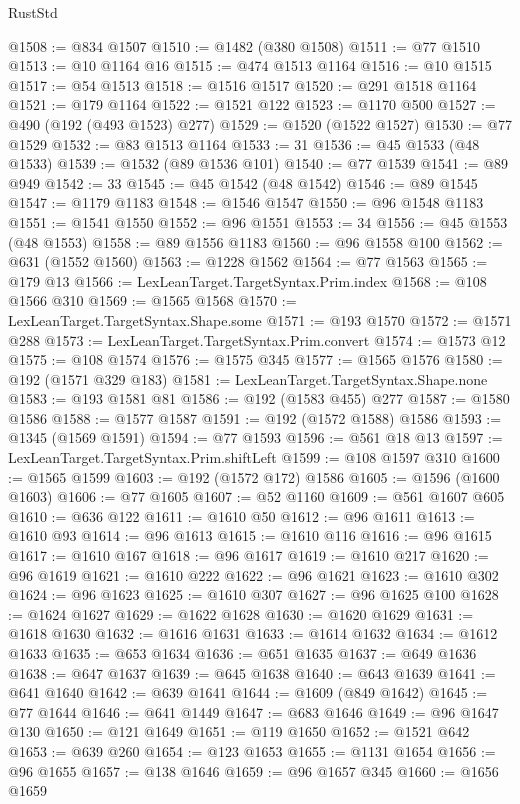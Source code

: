 \begin{lexlean}{RustStd}
\begin{coremodule}
@1508 := @834 @1507
@1510 := @1482 (@380 @1508)
@1511 := @77 @1510
@1513 := @10 @1164 @16
@1515 := @474 @1513 @1164
@1516 := @10 @1515
@1517 := @54 @1513
@1518 := @1516 @1517
@1520 := @291 @1518 @1164
@1521 := @179 @1164
@1522 := @1521 @122
@1523 := @1170 @500
@1527 := @490 (@192 (@493 @1523) @277)
@1529 := @1520 (@1522 @1527)
@1530 := @77 @1529
@1532 := @83 @1513 @1164
@1533 := 31
@1536 := @45 @1533 (@48 @1533)
@1539 := @1532 (@89 @1536 @101)
@1540 := @77 @1539
@1541 := @89 @949
@1542 := 33
@1545 := @45 @1542 (@48 @1542)
@1546 := @89 @1545
@1547 := @1179 @1183
@1548 := @1546 @1547
@1550 := @96 @1548 @1183
@1551 := @1541 @1550
@1552 := @96 @1551
@1553 := 34
@1556 := @45 @1553 (@48 @1553)
@1558 := @89 @1556 @1183
@1560 := @96 @1558 @100
@1562 := @631 (@1552 @1560)
@1563 := @1228 @1562
@1564 := @77 @1563
@1565 := @179 @13
@1566 := LexLeanTarget.TargetSyntax.Prim.index
@1568 := @108 @1566 @310
@1569 := @1565 @1568
@1570 := LexLeanTarget.TargetSyntax.Shape.some
@1571 := @193 @1570
@1572 := @1571 @288
@1573 := LexLeanTarget.TargetSyntax.Prim.convert
@1574 := @1573 @12
@1575 := @108 @1574
@1576 := @1575 @345
@1577 := @1565 @1576
@1580 := @192 (@1571 @329 @183)
@1581 := LexLeanTarget.TargetSyntax.Shape.none
@1583 := @193 @1581 @81
@1586 := @192 (@1583 @455) @277
@1587 := @1580 @1586
@1588 := @1577 @1587
@1591 := @192 (@1572 @1588) @1586
@1593 := @1345 (@1569 @1591)
@1594 := @77 @1593
@1596 := @561 @18 @13
@1597 := LexLeanTarget.TargetSyntax.Prim.shiftLeft
@1599 := @108 @1597 @310
@1600 := @1565 @1599
@1603 := @192 (@1572 @172) @1586
@1605 := @1596 (@1600 @1603)
@1606 := @77 @1605
@1607 := @52 @1160
@1609 := @561 @1607 @605
@1610 := @636 @122
@1611 := @1610 @50
@1612 := @96 @1611
@1613 := @1610 @93
@1614 := @96 @1613
@1615 := @1610 @116
@1616 := @96 @1615
@1617 := @1610 @167
@1618 := @96 @1617
@1619 := @1610 @217
@1620 := @96 @1619
@1621 := @1610 @222
@1622 := @96 @1621
@1623 := @1610 @302
@1624 := @96 @1623
@1625 := @1610 @307
@1627 := @96 @1625 @100
@1628 := @1624 @1627
@1629 := @1622 @1628
@1630 := @1620 @1629
@1631 := @1618 @1630
@1632 := @1616 @1631
@1633 := @1614 @1632
@1634 := @1612 @1633
@1635 := @653 @1634
@1636 := @651 @1635
@1637 := @649 @1636
@1638 := @647 @1637
@1639 := @645 @1638
@1640 := @643 @1639
@1641 := @641 @1640
@1642 := @639 @1641
@1644 := @1609 (@849 @1642)
@1645 := @77 @1644
@1646 := @641 @1449
@1647 := @683 @1646
@1649 := @96 @1647 @130
@1650 := @121 @1649
@1651 := @119 @1650
@1652 := @1521 @642
@1653 := @639 @260
@1654 := @123 @1653
@1655 := @1131 @1654
@1656 := @96 @1655
@1657 := @138 @1646
@1659 := @96 @1657 @345
@1660 := @1656 @1659

\end{coremodule}
\end{lexlean}
